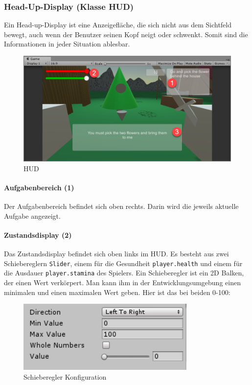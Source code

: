 \subsubsection{Head-Up-Display (Klasse HUD)}
Ein Head-up-Display ist eine Anzeigefläche, die sich nicht aus dem Sichtfeld bewegt, auch wenn der Benutzer seinen Kopf neigt oder schwenkt.
Somit sind die Informationen in jeder Situation ablesbar.

\begin{figure}[H]
\includegraphics[scale=0.8]{screenshots/hud.png}
\caption{HUD}
\end{figure}

 
\paragraph{Aufgabenbereich (1)}
Der Aufgabenbereich befindet sich oben rechts.
Darin wird die jeweils aktuelle Aufgabe angezeigt.

\paragraph{Zustandsdisplay (2)}
Das Zustandsdisplay befindet sich oben links im HUD.
Es besteht aus zwei Schiebereglern \lstinline{Slider}, einem für die Gesundheit \lstinline{player.health} und einem für die Ausdauer \lstinline{player.stamina} des Spielers.
Ein Schieberegler ist ein 2D Balken, der einen Wert verkörpert. Man kann ihm in der Entwicklungsumgebung einen minimalen und einen maximalen Wert geben. Hier ist das bei beiden 0-100:

\begin{figure}[H]
\includegraphics[scale=1]{screenshots/nullhundert.png}
\caption{Schieberegler Konfiguration}
\end{figure}

